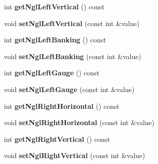 \begin{DoxyCompactItemize}
\item 
\hypertarget{classDatapackage_a6c4c0264794960adfa3eaee8915fbca4}{int {\bfseries get\-Ngl\-Left\-Vertical} () const }\label{classDatapackage_a6c4c0264794960adfa3eaee8915fbca4}

\item 
\hypertarget{classDatapackage_a7f4292e52c6593fb6a7f945bbe43d676}{void {\bfseries set\-Ngl\-Left\-Vertical} (const int \&value)}\label{classDatapackage_a7f4292e52c6593fb6a7f945bbe43d676}

\item 
\hypertarget{classDatapackage_a6d23507972fa51bdea5bbbec1bba9f2a}{int {\bfseries get\-Ngl\-Left\-Banking} () const }\label{classDatapackage_a6d23507972fa51bdea5bbbec1bba9f2a}

\item 
\hypertarget{classDatapackage_aba24fae055a6787a81b99c81e22f9bfd}{void {\bfseries set\-Ngl\-Left\-Banking} (const int \&value)}\label{classDatapackage_aba24fae055a6787a81b99c81e22f9bfd}

\item 
\hypertarget{classDatapackage_a10f585ca2766a946d699d6cb7b8e4778}{int {\bfseries get\-Ngl\-Left\-Gauge} () const }\label{classDatapackage_a10f585ca2766a946d699d6cb7b8e4778}

\item 
\hypertarget{classDatapackage_a74476d803f2e78fba816912c94216fcb}{void {\bfseries set\-Ngl\-Left\-Gauge} (const int \&value)}\label{classDatapackage_a74476d803f2e78fba816912c94216fcb}

\item 
\hypertarget{classDatapackage_a96c30884f05365f32d11ab45f98746a2}{int {\bfseries get\-Ngl\-Right\-Horizontal} () const }\label{classDatapackage_a96c30884f05365f32d11ab45f98746a2}

\item 
\hypertarget{classDatapackage_af2051e2ec406cd5721850bfac7871e6d}{void {\bfseries set\-Ngl\-Right\-Horizontal} (const int \&value)}\label{classDatapackage_af2051e2ec406cd5721850bfac7871e6d}

\item 
\hypertarget{classDatapackage_acefd0e7c889cc8d95323dd0f26753dc5}{int {\bfseries get\-Ngl\-Right\-Vertical} () const }\label{classDatapackage_acefd0e7c889cc8d95323dd0f26753dc5}

\item 
\hypertarget{classDatapackage_aa614672aabf5684b4d4832c9368a240b}{void {\bfseries set\-Ngl\-Right\-Vertical} (const int \&value)}\label{classDatapackage_aa614672aabf5684b4d4832c9368a240b}


\end{DoxyCompactItemize}
